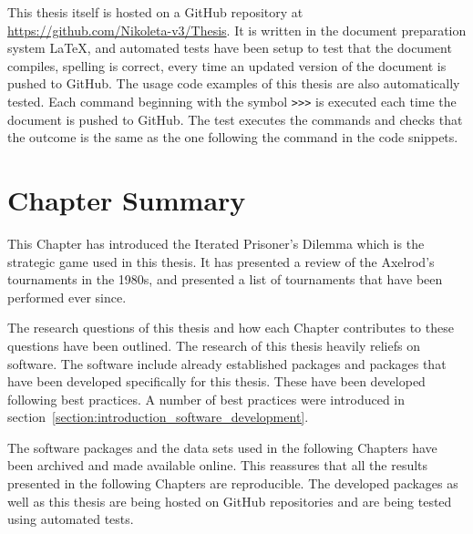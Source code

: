 This thesis itself is hosted on a GitHub repository at
\url{https://github.com/Nikoleta-v3/Thesis}. It is written in the document
preparation system \LaTeX, and automated tests have been setup to test
that the document compiles, spelling is correct, every time
an updated version of the document is pushed to GitHub. The usage code examples
of this thesis are also automatically tested. Each command beginning with the
symbol \texttt{>>>} is executed each time the document is pushed to GitHub.
The test executes the commands and checks that the outcome is the
same as the one following the command in the code snippets.

\section{Chapter Summary}

This Chapter has introduced the Iterated Prisoner's Dilemma which is the
strategic game used in this thesis. It has presented a review of the Axelrod's
tournaments in the 1980s, and presented a list of tournaments that have been
performed ever since.

The research questions of this thesis and how each Chapter contributes to these
questions have been outlined. The research of this thesis heavily reliefs on
software. The software include already established packages and packages that
have been developed specifically for this thesis. These have been developed
following best practices. A number of best practices were introduced in
section~\ref{section:introduction_software_development}.

The software packages and the data sets used in the following Chapters have been
archived and made available online. This reassures that all the results
presented in the following Chapters are reproducible. The developed packages as
well as this thesis are being hosted on GitHub repositories and are being tested
using automated tests.
